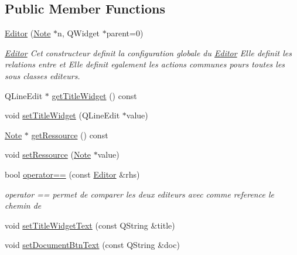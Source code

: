 \subsection*{Public Member Functions}
\begin{DoxyCompactItemize}
\item 
\hyperlink{class_editor_a2e30ad917816a6b1f023460bac7ffddd}{Editor} (\hyperlink{class_note}{Note} $\ast$n, Q\-Widget $\ast$parent=0)
\begin{DoxyCompactList}\small\item\em \hyperlink{class_editor}{Editor} Cet constructeur definit la configuration globale du \hyperlink{class_editor}{Editor} Elle definit les relations entre   et  Elle definit egalement les actions communes pours toutes les sous classes editeurs. \end{DoxyCompactList}\item 
Q\-Line\-Edit $\ast$ \hyperlink{class_editor_a1b3aa891ca7ccdf26fb2d37dbce0bcf2}{get\-Title\-Widget} () const 
\item 
void \hyperlink{class_editor_a3d7fdcc96ea00845ab502e1c610a61f7}{set\-Title\-Widget} (Q\-Line\-Edit $\ast$value)
\item 
\hyperlink{class_note}{Note} $\ast$ \hyperlink{class_editor_aa76e275000e3bd487338484f5f7cc77e}{get\-Ressource} () const 
\item 
void \hyperlink{class_editor_ab8f8755c826acda573a2b860e09bad9b}{set\-Ressource} (\hyperlink{class_note}{Note} $\ast$value)
\item 
bool \hyperlink{class_editor_aed1b30f9b2011c45f7ac997ace4a43b0}{operator==} (const \hyperlink{class_editor}{Editor} \&rhs)
\begin{DoxyCompactList}\small\item\em operator == permet de comparer les deux editeurs avec comme reference le chemin de  \end{DoxyCompactList}\item 
void \hyperlink{class_editor_a440e234dc539873303a49a1dc7b77ebc}{set\-Title\-Widget\-Text} (const Q\-String \&title)
\item 
void \hyperlink{class_editor_a22518796249b65e6a6f02245086ac794}{set\-Document\-Btn\-Text} (const Q\-String \&doc)
\end{DoxyCompactItemize}

